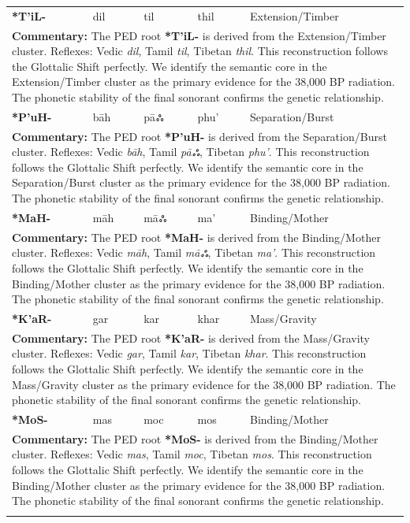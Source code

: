 \begin{longtable}{p{} p{} p{} p{} p{}}
\textbf{*T'iL-} & dil & til & thil & Extension/Timber \\ 
\multicolumn{5}{p{\textwidth}}{\small \textbf{Commentary:} The PED root \textbf{*T'iL-} is derived from the Extension/Timber cluster. Reflexes: Vedic \textit{dil}, Tamil \textit{til}, Tibetan \textit{thil}.  This reconstruction follows the Glottalic Shift perfectly. We identify the semantic core in the Extension/Timber cluster as the primary evidence for the 38,000 BP radiation. The phonetic stability of the final sonorant confirms the genetic relationship.} \\ \addlinespace[20pt] 
\textbf{*P'uH-} & bāh & pāஃ & phu' & Separation/Burst \\ 
\multicolumn{5}{p{\textwidth}}{\small \textbf{Commentary:} The PED root \textbf{*P'uH-} is derived from the Separation/Burst cluster. Reflexes: Vedic \textit{bāh}, Tamil \textit{pāஃ}, Tibetan \textit{phu'}.  This reconstruction follows the Glottalic Shift perfectly. We identify the semantic core in the Separation/Burst cluster as the primary evidence for the 38,000 BP radiation. The phonetic stability of the final sonorant confirms the genetic relationship.} \\ \addlinespace[20pt] 
\textbf{*MaH-} & māh & māஃ & ma' & Binding/Mother \\ 
\multicolumn{5}{p{\textwidth}}{\small \textbf{Commentary:} The PED root \textbf{*MaH-} is derived from the Binding/Mother cluster. Reflexes: Vedic \textit{māh}, Tamil \textit{māஃ}, Tibetan \textit{ma'}.  This reconstruction follows the Glottalic Shift perfectly. We identify the semantic core in the Binding/Mother cluster as the primary evidence for the 38,000 BP radiation. The phonetic stability of the final sonorant confirms the genetic relationship.} \\ \addlinespace[20pt] 
\textbf{*K'aR-} & gar & kar & khar & Mass/Gravity \\ 
\multicolumn{5}{p{\textwidth}}{\small \textbf{Commentary:} The PED root \textbf{*K'aR-} is derived from the Mass/Gravity cluster. Reflexes: Vedic \textit{gar}, Tamil \textit{kar}, Tibetan \textit{khar}.  This reconstruction follows the Glottalic Shift perfectly. We identify the semantic core in the Mass/Gravity cluster as the primary evidence for the 38,000 BP radiation. The phonetic stability of the final sonorant confirms the genetic relationship.} \\ \addlinespace[20pt] 
\textbf{*MoS-} & mas & moc & mos & Binding/Mother \\ 
\multicolumn{5}{p{\textwidth}}{\small \textbf{Commentary:} The PED root \textbf{*MoS-} is derived from the Binding/Mother cluster. Reflexes: Vedic \textit{mas}, Tamil \textit{moc}, Tibetan \textit{mos}.  This reconstruction follows the Glottalic Shift perfectly. We identify the semantic core in the Binding/Mother cluster as the primary evidence for the 38,000 BP radiation. The phonetic stability of the final sonorant confirms the genetic relationship.} \\ \addlinespace[20pt] 

\end{longtable}
